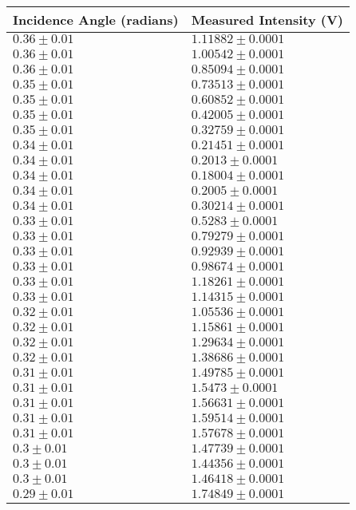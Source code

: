 \begin{tabular}{| p{} | p{} |}
\hline
Incidence Angle (radians) & Measured Intensity (V)\\
\hline
$0.36 \pm 0.01$ & $1.11882 \pm 0.0001$\\
$0.36 \pm 0.01$ & $1.00542 \pm 0.0001$\\
$0.36 \pm 0.01$ & $0.85094 \pm 0.0001$\\
$0.35 \pm 0.01$ & $0.73513 \pm 0.0001$\\
$0.35 \pm 0.01$ & $0.60852 \pm 0.0001$\\
$0.35 \pm 0.01$ & $0.42005 \pm 0.0001$\\
$0.35 \pm 0.01$ & $0.32759 \pm 0.0001$\\
$0.34 \pm 0.01$ & $0.21451 \pm 0.0001$\\
$0.34 \pm 0.01$ & $0.2013 \pm 0.0001$\\
$0.34 \pm 0.01$ & $0.18004 \pm 0.0001$\\
$0.34 \pm 0.01$ & $0.2005 \pm 0.0001$\\
$0.34 \pm 0.01$ & $0.30214 \pm 0.0001$\\
$0.33 \pm 0.01$ & $0.5283 \pm 0.0001$\\
$0.33 \pm 0.01$ & $0.79279 \pm 0.0001$\\
$0.33 \pm 0.01$ & $0.92939 \pm 0.0001$\\
$0.33 \pm 0.01$ & $0.98674 \pm 0.0001$\\
$0.33 \pm 0.01$ & $1.18261 \pm 0.0001$\\
$0.33 \pm 0.01$ & $1.14315 \pm 0.0001$\\
$0.32 \pm 0.01$ & $1.05536 \pm 0.0001$\\
$0.32 \pm 0.01$ & $1.15861 \pm 0.0001$\\
$0.32 \pm 0.01$ & $1.29634 \pm 0.0001$\\
$0.32 \pm 0.01$ & $1.38686 \pm 0.0001$\\
$0.31 \pm 0.01$ & $1.49785 \pm 0.0001$\\
$0.31 \pm 0.01$ & $1.5473 \pm 0.0001$\\
$0.31 \pm 0.01$ & $1.56631 \pm 0.0001$\\
$0.31 \pm 0.01$ & $1.59514 \pm 0.0001$\\
$0.31 \pm 0.01$ & $1.57678 \pm 0.0001$\\
$0.3 \pm 0.01$ & $1.47739 \pm 0.0001$\\
$0.3 \pm 0.01$ & $1.44356 \pm 0.0001$\\
$0.3 \pm 0.01$ & $1.46418 \pm 0.0001$\\
$0.29 \pm 0.01$ & $1.74849 \pm 0.0001$\\
\hline
\end{tabular}\hfill
